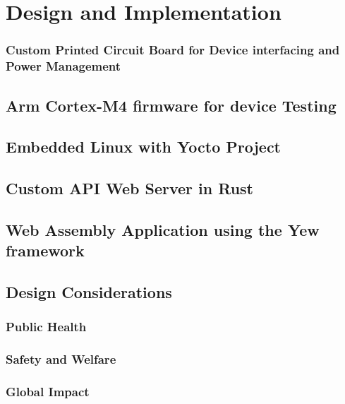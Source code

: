 \documentclass[12pt]{article}
\begin{document}
\section{Design and Implementation}
\subsubsection{Custom Printed Circuit Board for Device interfacing and Power Management}

\subsection{Arm Cortex-M4 firmware for device Testing}

\subsection{Embedded Linux with Yocto Project}

\subsection{Custom API Web Server in Rust}

\subsection{Web Assembly Application using the Yew framework}


\subsection{Design Considerations}

\subsubsection{Public Health}

\subsubsection{Safety and Welfare}

\subsubsection{Global Impact}
\end{document}
